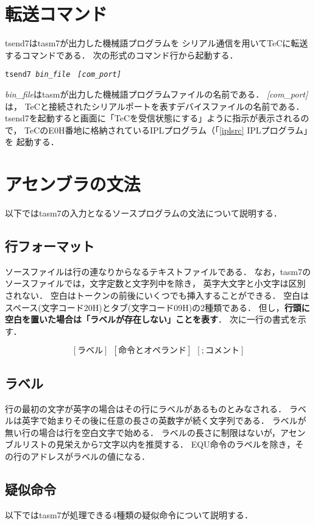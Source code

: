 \section{転送コマンド}
tsend7はtasm7が出力した機械語プログラムを
シリアル通信を用いてTeCに転送するコマンドである．
次の形式のコマンド行から起動する．

\begin{center}
{\small\tt tsend7  {\it bin\_file}　{\it [com\_port]}} \\
\end{center}

{\it bin\_file}はtasmが出力した機械語プログラムファイルの名前である．
{\it [com\_port]}は，
TeCと接続されたシリアルポートを表すデバイスファイルの名前である．
tsend7を起動すると画面に「TeCを受信状態にする」ように指示が表示されるので，
TeCのE0H番地に格納されているIPLプログラム（「\ref{iplsrc} IPLプログラム」を
起動する．

\section{アセンブラの文法}
\label{syn}
以下ではtasm7の入力となるソースプログラムの文法について説明する．

\subsection{行フォーマット}
ソースファイルは行の連なりからなるテキストファイルである．
なお，tasm7のソースファイルでは，文字定数と文字列中を除き，
英字大文字と小文字は区別されない．
空白はトークンの前後にいくつでも挿入することができる．
空白はスペース(文字コード20H)とタブ(文字コード09H)の2種類である．
但し，{\bf 行頭に空白を置いた場合は「ラベルが存在しない」ことを表す}．
次に一行の書式を示す．

{\small\[ [ラベル]~~[命令とオペランド]~~[;コメント] \]}

\subsection{ラベル}
行の最初の文字が英字の場合はその行にラベルがあるものとみなされる．
ラベルは英字で始まりその後に任意の長さの英数字が続く文字列である．
ラベルが無い行の場合は行を空白文字で始める．
ラベルの長さに制限はないが，アセンブルリストの見栄えから7文字以内を推奨する．
EQU命令のラベルを除き，その行のアドレスがラベルの値になる．

\subsection{疑似命令}
以下ではtasm7が処理できる4種類の疑似命令について説明する．


